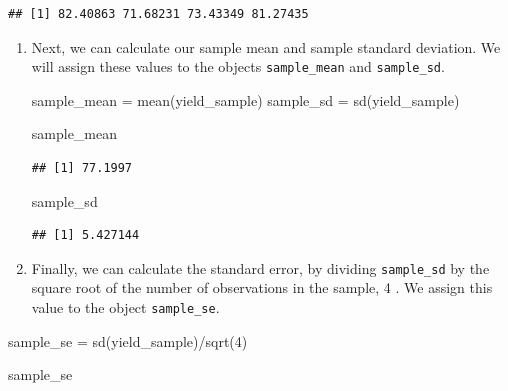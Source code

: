 \documentclass[
]{book}
\newenvironment{Shaded}{\begin{snugshade}}{\end{snugshade}}
\newcommand{\AttributeTok}[1]{\textcolor[rgb]{0.77,0.63,0.00}{#1}}
\newcommand{\CommentTok}[1]{\textcolor[rgb]{0.56,0.35,0.01}{\textit{#1}}}
\newcommand{\DecValTok}[1]{\textcolor[rgb]{0.00,0.00,0.81}{#1}}
\newcommand{\FunctionTok}[1]{\textcolor[rgb]{0.00,0.00,0.00}{#1}}
\newcommand{\NormalTok}[1]{#1}
\newcommand{\OtherTok}[1]{\textcolor[rgb]{0.56,0.35,0.01}{#1}}
\newcommand{\SpecialCharTok}[1]{\textcolor[rgb]{0.00,0.00,0.00}{#1}}
\begin{document}
\begin{Shaded}
\end{Shaded}

\begin{verbatim}
## [1] 82.40863 71.68231 73.43349 81.27435
\end{verbatim}

\begin{enumerate}
\def\labelenumi{\arabic{enumi}.}
\setcounter{enumi}{2}
\item
  Next, we can calculate our sample mean and sample standard
  deviation. We will assign these values to the objects \texttt{sample\_mean}
  and \texttt{sample\_sd}.

\begin{Shaded}
\begin{Highlighting}[]
\NormalTok{sample\_mean }\OtherTok{=} \FunctionTok{mean}\NormalTok{(yield\_sample)}
\NormalTok{sample\_sd }\OtherTok{=} \FunctionTok{sd}\NormalTok{(yield\_sample)}

\NormalTok{sample\_mean}
\end{Highlighting}
\end{Shaded}

\begin{verbatim}
## [1] 77.1997
\end{verbatim}

\begin{Shaded}
\begin{Highlighting}[]
\NormalTok{sample\_sd}
\end{Highlighting}
\end{Shaded}

\begin{verbatim}
## [1] 5.427144
\end{verbatim}
\item
  Finally, we can calculate the standard error, by dividing
  \texttt{sample\_sd} by the square root of the number of observations in the
  sample, 4 . We assign this value to the object \texttt{sample\_se}.
\end{enumerate}

\begin{Shaded}
\begin{Highlighting}[]
\NormalTok{sample\_se }\OtherTok{=} \FunctionTok{sd}\NormalTok{(yield\_sample)}\SpecialCharTok{/}\FunctionTok{sqrt}\NormalTok{(}\DecValTok{4}\NormalTok{)}

\NormalTok{sample\_se}
\end{Highlighting}
\end{Shaded}
\end{document}
